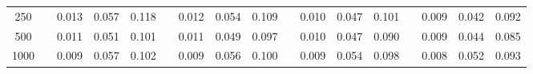 % 
\begin{tabular}{ccccccccccccccccc}
  \hline
  \hline
250 &  & 0.013 & 0.057 & 0.118 &  & 0.012 & 0.054 & 0.109 &  & 0.010 & 0.047 & 0.101 &  & 0.009 & 0.042 & 0.092 \\ 
  500 &  & 0.011 & 0.051 & 0.101 &  & 0.011 & 0.049 & 0.097 &  & 0.010 & 0.047 & 0.090 &  & 0.009 & 0.044 & 0.085 \\ 
  1000 &  & 0.009 & 0.057 & 0.102 &  & 0.009 & 0.056 & 0.100 &  & 0.009 & 0.054 & 0.098 &  & 0.008 & 0.052 & 0.093 \\ 
   \hline
\end{tabular}
